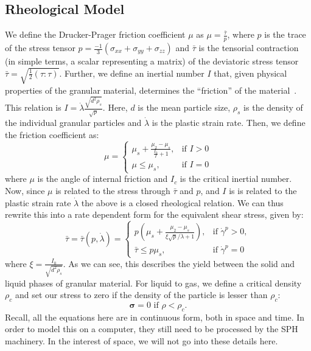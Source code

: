 \documentclass{article}
\begin{document}
\subsection*{Rheological Model}
We define the Drucker-Prager friction coefficient $\mu$ as $\mu =  \frac{\bar{\tau}}{p}$, where $p$ is the trace of the stress tensor $p = \frac{-1}{3}(\sigma_{xx}+\sigma_{yy}+\sigma_{zz})$ and $\bar{\tau}$ is the tensorial contraction (in simple terms, a scalar representing a matrix) of the deviatoric stress tensor  $\bar{\tau} = \sqrt{\frac{1}{2}\left(\tau : \tau\right)}$. Further, we define an inertial number $I$ that, given physical properties of the granular material, determines the ``friction'' of the material~\citep{Jop2006}. This relation is $I = \dot{\lambda} \frac{\sqrt{d^2\rho_s}}{\sqrt{p}}$. Here, $d$ is the mean particle size, $\rho_s$ is the density of the individual granular particles and $\dot{\lambda}$ is the plastic strain rate. Then, we define the friction coefficient as:
\begin{equation}
  \mu = \begin{cases} 
    \mu_s + \frac{\mu_2 - \mu_s}{\frac{I_0}{I} + 1}, & \text{if } I > 0 \\
    \mu \leq \mu_s, & \text{if } I = 0
  \end{cases}
\end{equation}
where $\mu$ is the angle of internal friction and $I_c$ is the critical inertial number.
Now, since $\mu$ is related to the stress through $\bar{\tau}$ and $p$, and $I$ is is related to the plastic strain rate $\dot{\lambda}$ the above is a closed rheological relation. We can thus rewrite this into a rate dependent form for the equivalent shear stress, given by:
\[
\bar{\tau} = \bar{\tau}(p, \dot{\lambda}) =
\begin{cases} 
    p \left( \mu_s + \frac{\mu_2 - \mu_s}{\xi \sqrt{p}/\dot{\lambda} + 1} \right), & \text{if } \dot{\gamma}^p > 0, \\
    \bar{\tau} \leq p\mu_s, & \text{if } \dot{\gamma}^p = 0
\end{cases}
\]
where $\xi = \frac{I_0}{\sqrt{d^2 \rho_s}}$. As we can see, this describes the yield between the solid and liquid phases of granular material. For liquid to gas, we define a critical density $\rho_c$ and set our stress to zero if the density of the particle is lesser than $\rho_c$:
\[\boldsymbol{\sigma} = 0 \text{ if } \rho < \rho_c.\]
Recall, all the equations here are in continuous form, both in space and time. In order to model this on a computer, they still need to be processed by the SPH machinery. In the interest of space, we will not go into these details here.
\end{document}
